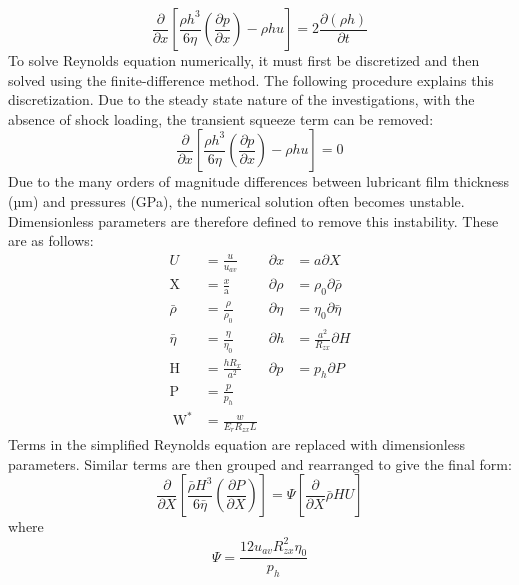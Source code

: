 \begin{equation}\label{eq3.1}
	\frac{\partial}{\partial x}\left[\frac{\rho h^{3}}{6 \eta}\left(\frac{\partial p}{\partial x}\right)-\rho h u\right]=2 \frac{\partial(\rho h)}{\partial t}
\end{equation}
To solve Reynolds equation numerically, it must first be discretized and then solved using the finite-difference method. The following procedure explains this discretization.
Due to the steady state nature of the investigations, with the absence of shock loading, the transient squeeze term can be removed:
\begin{equation}\label{eq3.2}
	\frac{\partial}{\partial x}\left[\frac{\rho h^{3}}{6 \eta}\left(\frac{\partial p}{\partial x}\right)-\rho h u\right]=0
\end{equation}
Due to the many orders of magnitude differences between lubricant film thickness (µm) and pressures (GPa), the numerical solution often becomes unstable. Dimensionless parameters are therefore defined to remove this instability. These are as follows:
\begin{equation}\label{eq3.3}
	\begin{aligned}
		U &=\frac{u}{u_{a v}} & \partial x &=a \partial X \\
		\mathrm{X} &=\frac{x}{\mathrm{a}} & \partial \rho &=\rho_{0} \partial \bar{\rho} \\
		\bar{\rho} &=\frac{\rho}{\rho_{0}} & \partial \eta &=\eta_{0} \partial \bar{\eta} \\
		\bar{\eta} &=\frac{\eta}{\eta_{0}} & \partial h &=\frac{a^{2}}{R_{z x}} \partial H \\
		\mathrm{H} &=\frac{h R_{x}}{a^{2}} & \partial p &=p_{h} \partial P \\
		\mathrm{P} &=\frac{p}{p_{h}} & \\
		\mathrm{~W}^{*} &=\frac{w}{E_{r} R_{z x} L} &
	\end{aligned}
\end{equation}
Terms in the simplified Reynolds equation are replaced with dimensionless parameters. Similar terms are then grouped and rearranged to give the final form:
\begin{equation}\label{eq3.4}
	\frac{\partial}{\partial X}\left[\frac{\bar{\rho} H^{3}}{6 \bar{\eta}}\left(\frac{\partial P}{\partial X}\right)\right]=\Psi\left[\frac{\partial}{\partial X} \bar{\rho} H U\right]
\end{equation}
where
\begin{equation}\label{eq3.5}
	\Psi=\frac{12 u_{a v} R_{z x}^{2} \eta_{0}}{p_{h}}
\end{equation}
